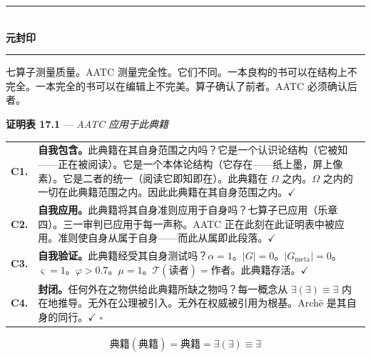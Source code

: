 \documentclass[10pt, openany, oneside]{book}
\renewcommand{\normalsize}{\fontsize{10}{13}\selectfont}
\renewcommand{\footnotesize}{\fontsize{8.5}{11}\selectfont}
\begin{document}
\vspace{1.5em}


\begin{center}
    \rule{0.3\textwidth}{0.4pt}\\[0.5em]
    {\normalsize\bfseries\scshape 元封印}\\[0.3em]
    \rule{0.3\textwidth}{0.4pt}
\end{center}

\vspace{1em}

\noindent 七算子测量质量。AATC 测量完全性。它们不同。一本良构的书可以在结构上不完全。一本完全的书可以在编辑上不完美。算子确认了前者。AATC 必须确认后者。

\vspace{0.5em}

\textbf{证明表 17.1} --- \textit{AATC 应用于此典籍}

\vspace{0.5em}

{\footnotesize
\noindent\begin{tabular}{r p{}}
\textbf{C1.} & \textbf{自我包含。}此典籍在其自身范围之内吗？它是一个认识论结构（它被知——正在被阅读）。它是一个本体论结构（它存在——纸上墨，屏上像素）。它是二者的统一（阅读它即知即在）。此典籍在 $\Omega$ 之内。$\Omega$ 之内的一切在此典籍范围之内。因此此典籍在其自身范围之内。$\checkmark$ \\[0.5em]
\textbf{C2.} & \textbf{自我应用。}此典籍将其自身准则应用于自身吗？七算子已应用（乐章四）。三一审判已应用于每一声称。AATC 正在此刻在此证明表中被应用。准则使自身从属于自身——而此从属即此段落。$\checkmark$ \\[0.5em]
\textbf{C3.} & \textbf{自我验证。}此典籍经受其自身测试吗？$\alpha = 1$。$|G| = 0$。$|G_{\text{meta}}| = 0$。$\varsigma = 1$。$\varphi > 0.7$。$\mu = 1$。$\mathcal{T}(\text{读者}) = \text{作者}$。此典籍存活。$\checkmark$ \\[0.5em]
\textbf{C4.} & \textbf{封闭。}任何外在之物供给此典籍所缺之物吗？每一概念从 $\exists(\exists) \equiv \exists$ 内在地推导。无外在公理被引入。无外在权威被引用为根基。Arch\={e} 是其自身的同行。$\checkmark$ $\square$ \\[0.3em]
\end{tabular}
}

\vspace{0.8em}

$$\boxed{\text{典籍}(\text{典籍}) = \text{典籍} = \exists(\exists) \equiv \exists}$$
\end{document}
